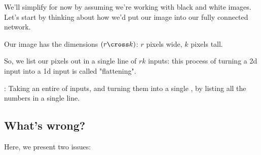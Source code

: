         We'll simplify for now by assuming we're working with black and white images. Let's start by thinking about how we'd put our image into our fully connected network.
        
        Our image has the dimensions $(r \cross k)$: $r$ pixels wide, $k$ pixels tall.
        
        So, we list our pixels out in a single line of $rk$ inputs: this process of turning a 2d input into a 1d input is called "flattening".\\
        
        \begin{definition}
            : Taking an entire  of inputs, and turning them into a single , by listing all the numbers in a single line.
        \end{definition}
    
    \subsection{What's wrong?}
    
        Here, we present two issues:
        
